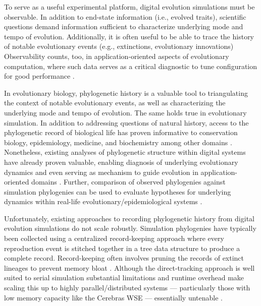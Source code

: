To serve as a useful experimental platform, digital evolution simulations must be observable.
In addition to end-state information (i.e., evolved traits), scientific questions demand information sufficient to characterize underlying mode and tempo of evolution.
Additionally, it is often useful to be able to trace the history of notable evolutionary events (e.g., extinctions, evolutionary innovations)
Observability counts, too, in application-oriented aspects of evolutionary computation, where such data serves as a critical diagnostic to tune configuration for good performance \citep{hernandez2022can}.

In evolutionary biology, phylogenetic history is a valuable tool to triangulating the context of notable evolutionary events, as well as characterizing the underlying mode and tempo of evolution.
The same holds true in evolutionary simulation.
In addition to addressing questions of natural history, access to the phylogenetic record of biological life has proven informative to conservation biology, epidemiology, medicine, and biochemistry among other domains \citep{faithConservationEvaluationPhylogenetic1992, STAMATAKIS2005phylogenetics, frenchHostPhylogenyShapes2023,kim2006discovery}.
Nonetheless, existing analyses of phylogenetic structure within digital systems have already proven valuable, enabling diagnosis of underlying evolutionary dynamics \citep{moreno2023toward,hernandez2022can,shahbandegan2022untangling, lewinsohnStatedependentEvolutionaryModels2023a} and even serving as mechanism to guide evolution in application-oriented domains \citep{lalejini2024phylogeny,lalejini2024runtime,murphy2008simple,burke2003increased}.
Further, comparison of observed phylogenies against simulation phylogenies can be used to evaluate hypotheses for underlying dynamics within real-life evolutionary/epidemiological systems \citep{giardina2017inference,voznica2022deep}.

Unfortunately, existing approaches to recording phylogenetic history from digital evolution simulations do not scale robustly.
Simulation phylogenies have typically been collected using a centralized record-keeping approach where every reproduction event is stitched together in a tree data structure to produce a complete record.
Record-keeping often involves pruning the records of extinct lineages to prevent memory bloat \citep{dolson2023phylotrack}.
Although the direct-tracking approach is well suited to serial simulation substantial limitations and runtime overhead make scaling this up to highly parallel/distributed systems --- particularly those with low memory capacity like the Cerebras WSE --- essentially untenable \citep{moreno2024analysis}.

